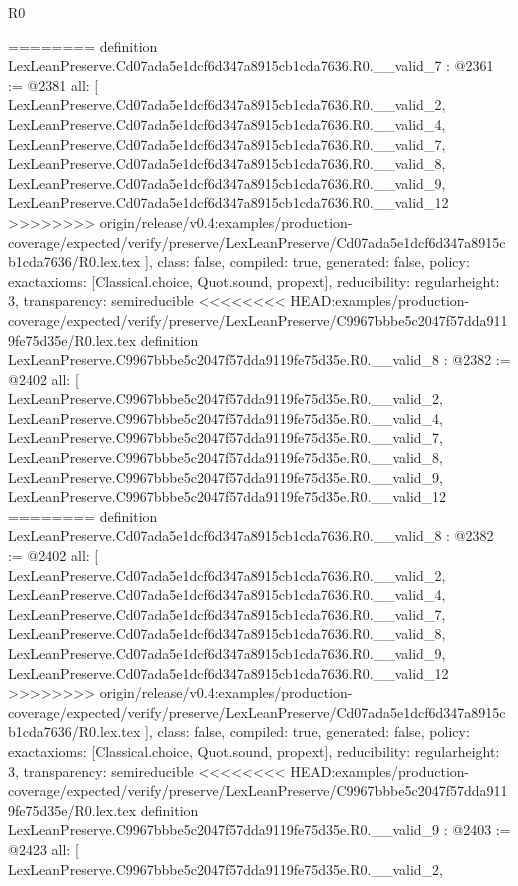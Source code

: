 \begin{lexlean}{R0}
\begin{coremodule}
{{{{{{{{{{{{{{{{{{{{{{{{{{{{{{{{{{{{{{{{{{{{{{========
definition LexLeanPreserve.Cd07ada5e1dcf6d347a8915cb1cda7636.R0.__valid_7 : @2361 := @2381 {
  all: [
    LexLeanPreserve.Cd07ada5e1dcf6d347a8915cb1cda7636.R0.__valid_2,
    LexLeanPreserve.Cd07ada5e1dcf6d347a8915cb1cda7636.R0.__valid_4,
    LexLeanPreserve.Cd07ada5e1dcf6d347a8915cb1cda7636.R0.__valid_7,
    LexLeanPreserve.Cd07ada5e1dcf6d347a8915cb1cda7636.R0.__valid_8,
    LexLeanPreserve.Cd07ada5e1dcf6d347a8915cb1cda7636.R0.__valid_9,
    LexLeanPreserve.Cd07ada5e1dcf6d347a8915cb1cda7636.R0.__valid_12
>>>>>>>> origin/release/v0.4:examples/production-coverage/expected/verify/preserve/LexLeanPreserve/Cd07ada5e1dcf6d347a8915cb1cda7636/R0.lex.tex
  ],
  class: false,
  compiled: true,
  generated: false,
  policy: exact{axioms: [Classical.choice, Quot.sound, propext]},
  reducibility: regular{height: 3},
  transparency: semireducible
}
<<<<<<<< HEAD:examples/production-coverage/expected/verify/preserve/LexLeanPreserve/C9967bbbe5c2047f57dda9119fe75d35e/R0.lex.tex
definition LexLeanPreserve.C9967bbbe5c2047f57dda9119fe75d35e.R0.__valid_8 : @2382 := @2402 {
  all: [
    LexLeanPreserve.C9967bbbe5c2047f57dda9119fe75d35e.R0.__valid_2,
    LexLeanPreserve.C9967bbbe5c2047f57dda9119fe75d35e.R0.__valid_4,
    LexLeanPreserve.C9967bbbe5c2047f57dda9119fe75d35e.R0.__valid_7,
    LexLeanPreserve.C9967bbbe5c2047f57dda9119fe75d35e.R0.__valid_8,
    LexLeanPreserve.C9967bbbe5c2047f57dda9119fe75d35e.R0.__valid_9,
    LexLeanPreserve.C9967bbbe5c2047f57dda9119fe75d35e.R0.__valid_12
========
definition LexLeanPreserve.Cd07ada5e1dcf6d347a8915cb1cda7636.R0.__valid_8 : @2382 := @2402 {
  all: [
    LexLeanPreserve.Cd07ada5e1dcf6d347a8915cb1cda7636.R0.__valid_2,
    LexLeanPreserve.Cd07ada5e1dcf6d347a8915cb1cda7636.R0.__valid_4,
    LexLeanPreserve.Cd07ada5e1dcf6d347a8915cb1cda7636.R0.__valid_7,
    LexLeanPreserve.Cd07ada5e1dcf6d347a8915cb1cda7636.R0.__valid_8,
    LexLeanPreserve.Cd07ada5e1dcf6d347a8915cb1cda7636.R0.__valid_9,
    LexLeanPreserve.Cd07ada5e1dcf6d347a8915cb1cda7636.R0.__valid_12
>>>>>>>> origin/release/v0.4:examples/production-coverage/expected/verify/preserve/LexLeanPreserve/Cd07ada5e1dcf6d347a8915cb1cda7636/R0.lex.tex
  ],
  class: false,
  compiled: true,
  generated: false,
  policy: exact{axioms: [Classical.choice, Quot.sound, propext]},
  reducibility: regular{height: 3},
  transparency: semireducible
}
<<<<<<<< HEAD:examples/production-coverage/expected/verify/preserve/LexLeanPreserve/C9967bbbe5c2047f57dda9119fe75d35e/R0.lex.tex
definition LexLeanPreserve.C9967bbbe5c2047f57dda9119fe75d35e.R0.__valid_9 : @2403 := @2423 {
  all: [
    LexLeanPreserve.C9967bbbe5c2047f57dda9119fe75d35e.R0.__valid_2,
}}}}}}}}}}}}}}}}}}}}}}}}}}}}}}}}}}}}}}}}}}}}}}}}
\end{coremodule}
\end{lexlean}
